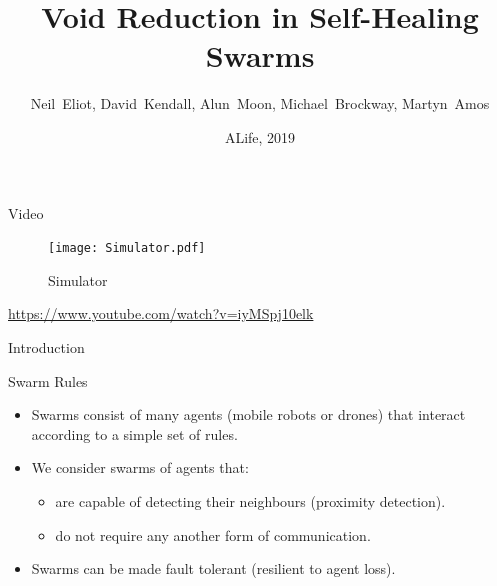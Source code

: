 \documentclass{beamer}
\title{Void Reduction in Self-Healing Swarms}
\author[N.~Eliot et al.]{Neil~Eliot\inst{1}, David~Kendall\inst{1}, Alun~Moon\inst{1}, Michael~Brockway\inst{1}, Martyn~Amos\inst{1}}
\institute[Northumbria University] %
{
  \inst{1}
  Department of Computer and Information Sciences\\
  University of Northumbria
}
\date{ALife, 2019}
\begin{document}
\begin{frame}
  \titlepage
\end{frame}

\begin{frame}{Video}
  \begin{center}
    \begin{figure}
      \begin{center}
        \texttt{[image: Simulator.pdf]}
      \end{center}
      \caption{Simulator}
    \end{figure}
    \href{https://www.youtube.com/watch?v=iyMSpj10elk}{https://www.youtube.com/watch?v=iyMSpj10elk}
  \end{center}
\end{frame}  


\begin{frame}{Introduction}
  \tableofcontents
\end{frame}



\begin{frame}{Swarm Rules}
  \begin{itemize}
  \item {
    Swarms consist of many agents (mobile robots or drones) that interact according to a simple set of rules.
  }
  \item {
    We consider swarms of agents that:
    \begin{itemize}
      \item are capable of detecting their neighbours (proximity detection). 
      \item do not require any another form of communication. 
    \end{itemize}
  }
  \item {
    Swarms can be made fault tolerant (resilient to agent loss).
  }
  \end{itemize}
\end{frame}
\end{document}
